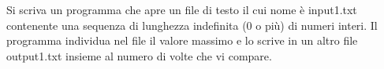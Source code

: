\begin{Exercise}[label={ex:massimo}]
    Si scriva un programma che apre un file di testo il cui
    nome è input1.txt contenente una sequenza di lunghezza indefinita (0 o più)
    di numeri interi. Il programma individua nel file il valore massimo e lo scrive in
    un altro file output1.txt insieme al numero di volte che vi compare.
\end{Exercise}

\begin{Answer}[ref={ex:massimo}]
  	
\end{Answer}